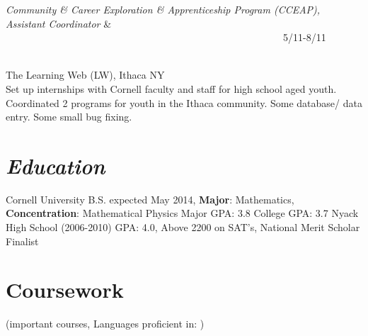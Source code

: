 \documentclass{res}
\begin{document}
{\begin{resume}
\begin{ncolumn}{2}
{\it Community \& Career Exploration \& Apprenticeship Program (CCEAP), Assistant Coordinator} &  ~~~~~~~~~~~~~~~~~~~~~~~~~~~~~~~~~~~~~~~~~~~~~~~~~~~~~~~~5/11-8/11
\end{ncolumn}\\
The Learning Web (LW), Ithaca NY\\
Set up internships with Cornell faculty and staff for high school aged youth. Coordinated 2 programs for youth in the Ithaca community. Some database/ data entry. Some small bug fixing.\\

\section{\sl\bf  Education}
Cornell University B.S. expected May 2014,
\textbf{Major}: Mathematics,
\textbf{Concentration}: Mathematical Physics
Major GPA: 3.8
College GPA: 3.7
Nyack High School (2006-2010) GPA: 4.0,
Above 2200 on SAT's,
National Merit Scholar Finalist

\section{\textbf{Coursework}}
(important courses, Languages proficient in:
)


\end{resume}}
\end{document}
